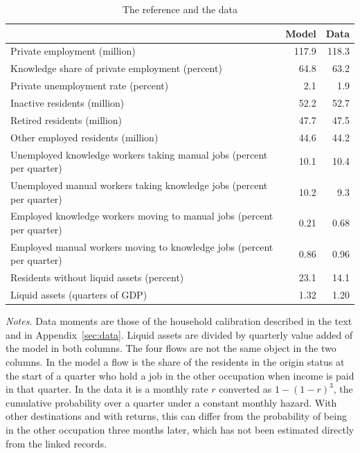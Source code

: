 \begin{table}[htbp]\centering\small
\caption{The reference and the data}\label{tab:fit}
\begin{tabularx}{\linewidth}{@{}>{\raggedright\arraybackslash}Xrr@{}}\toprule
 & Model & Data \\\midrule
Private employment (million) & 117.9 & 118.3 \\
Knowledge share of private employment (percent) & 64.8 & 63.2 \\
Private unemployment rate (percent) & 2.1 & 1.9 \\
Inactive residents (million) & 52.2 & 52.7 \\
Retired residents (million) & 47.7 & 47.5 \\
Other employed residents (million) & 44.6 & 44.2 \\
Unemployed knowledge workers taking manual jobs (percent per quarter) & 10.1 & 10.4 \\
Unemployed manual workers taking knowledge jobs (percent per quarter) & 10.2 & 9.3 \\
Employed knowledge workers moving to manual jobs (percent per quarter) & 0.21 & 0.68 \\
Employed manual workers moving to knowledge jobs (percent per quarter) & 0.86 & 0.96 \\
Residents without liquid assets (percent) & 23.1 & 14.1 \\
Liquid assets (quarters of GDP) & 1.32 & 1.20 \\
\bottomrule\end{tabularx}
\par\smallskip\begin{minipage}{\linewidth}\footnotesize\emph{Notes.} Data moments are those of the household calibration described in the text and in Appendix~\ref{sec:data}. Liquid assets are divided by quarterly value added of the model in both columns. The four flows are not the same object in the two columns. In the model a flow is the share of the residents in the origin status at the start of a quarter who hold a job in the other occupation when income is paid in that quarter. In the data it is a monthly rate $r$ converted as $1-(1-r)^3$, the cumulative probability over a quarter under a constant monthly hazard. With other destinations and with returns, this can differ from the probability of being in the other occupation three months later, which has not been estimated directly from the linked records.\end{minipage}
\end{table}
